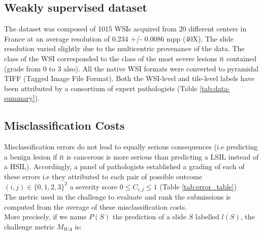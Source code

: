 \begin{table}[h]
\centering
{}
\caption{Dataset Summary}
\label{tab:data-summary}
\end{table}

\subsection{Weakly supervised dataset}
The dataset was composed of 1015 WSIs acquired from 20 different centers in France at an average resolution of 0.234 +/- 0.0086 mpp (40X). The slide resolution varied slightly due to the multicentric provenance of the data. The class of the WSI corresponded to the class of the most severe lesions it contained (grade from 0 to 3 also). All the native WSI formats were converted to pyramidal TIFF (Tagged Image File Format).
Both the WSI-level and tile-level labels have been attributed by a consortium of expert pathologists (Table \ref{tab:data-summary}).

\subsection{Misclassification Costs}

Misclassification errors do not lead to equally serious consequences (i.e predicting a benign lesion if it is cancerous is more serious than predicting a LSIL instead of a HSIL). Accordingly, a panel of pathologists established a grading of each of these errors i.e they attributed to each pair of possible outcome $(i,j) \in \{0, 1, 2, 3\}^{2}$ a severity score 
$0  \leqslant C_{i, j}  \leqslant 1$ (Table \ref{tab:error_table})  \\
The metric used in the challenge to evaluate and rank the submissions is computed from the average of these misclassification costs.\\
More precisely, if we name $P(S)$ the prediction of a slide $S$ labelled $l(S)$, the challenge metric $M_{WA}$ is: \\

